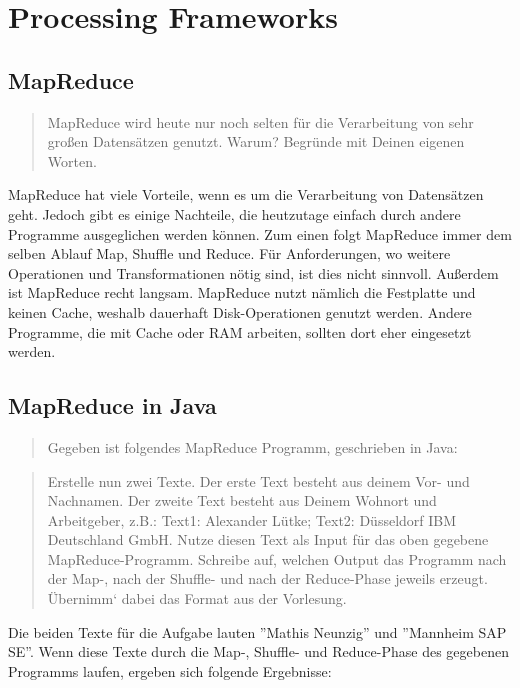 \chapter{Processing Frameworks}

\section{MapReduce}
\begin{quote}
    MapReduce wird heute nur noch selten für die Verarbeitung von sehr großen Datensätzen genutzt. Warum? Begründe mit Deinen eigenen Worten.
\end{quote}

MapReduce hat viele Vorteile, wenn es um die Verarbeitung von Datensätzen geht. Jedoch gibt es einige Nachteile, die heutzutage einfach durch andere Programme ausgeglichen werden können. Zum einen folgt MapReduce immer dem selben Ablauf Map, Shuffle und Reduce. Für Anforderungen, wo weitere Operationen und Transformationen nötig sind, ist dies nicht sinnvoll. Außerdem ist MapReduce recht langsam. MapReduce nutzt nämlich die Festplatte und keinen Cache, weshalb dauerhaft Disk-Operationen genutzt werden. Andere Programme, die mit Cache oder RAM arbeiten, sollten dort eher eingesetzt werden. 

\section{MapReduce in Java}
\begin{quote}
    Gegeben ist folgendes MapReduce Programm, geschrieben in Java:
\end{quote} 

\begin{quote}
    Erstelle nun zwei Texte. Der erste Text besteht aus deinem Vor- und Nachnamen. Der zweite Text besteht aus Deinem Wohnort und Arbeitgeber, z.B.: Text1: Alexander Lütke; Text2: Düsseldorf IBM Deutschland GmbH. Nutze diesen Text als Input für das oben gegebene MapReduce-Programm. Schreibe auf, welchen Output das Programm nach der Map-, nach der Shuffle- und nach der Reduce-Phase jeweils erzeugt. Übernimm‘ dabei das Format aus der Vorlesung.
\end{quote}
Die beiden Texte für die Aufgabe lauten ''Mathis Neunzig'' und ''Mannheim SAP SE''. Wenn diese Texte durch die Map-, Shuffle- und Reduce-Phase des gegebenen Programms laufen, ergeben sich folgende Ergebnisse:

